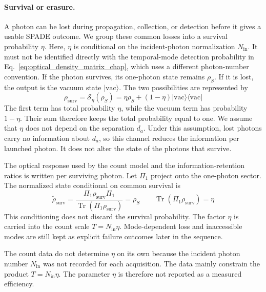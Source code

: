 \paragraph{Survival or erasure.}
A photon can be lost during propagation, collection, or detection before it gives a usable SPADE outcome.  We group these common losses into a survival probability $\eta$. Here, $\eta$ is conditional on the incident-photon normalization $N_{\mathrm{in}}$. It must not be identified directly with the temporal-mode detection probability in Eq.~\eqref{eq:optical_density_matrix_chap}, which uses a different photon-number convention. If the photon survives, its one-photon state remains $\rho_S$.  If it is lost, the output is the vacuum state $|\mathrm{vac}\rangle$.  The two possibilities are represented by
\begin{equation}
    \rho_{\mathrm{surv}}
    =\mathcal{S}_{\eta}(\rho_S)
    =\eta\rho_S+(1-\eta)|\mathrm{vac}\rangle\langle\mathrm{vac}|
    \label{eq:spade_loss_channel}
\end{equation}
The first term has total probability $\eta$, while the vacuum term has probability $1-\eta$.  Their sum therefore keeps the total probability equal to one.  We assume that $\eta$ does not depend on the separation $d_a$.  Under this assumption, lost photons carry no information about $d_a$, so this channel reduces the information per launched photon.  It does not alter the state of the photons that survive.

The optical response used by the count model and the information-retention ratios is written per surviving photon. Let $\Pi_1$ project onto the one-photon sector. The normalized state conditional on common survival is
\begin{equation}
    \widetilde{\rho}_{\mathrm{surv}}
    =
    \frac{\Pi_1\rho_{\mathrm{surv}}\Pi_1}
    {\operatorname{Tr}(\Pi_1\rho_{\mathrm{surv}})}
    =\rho_S
    \qquad
    \operatorname{Tr}(\Pi_1\rho_{\mathrm{surv}})=\eta
    \label{eq:spade_conditional_survival_state}
\end{equation}
This conditioning does not discard the survival probability. The factor $\eta$ is carried into the count scale $T=N_{\mathrm{in}}\eta$. Mode-dependent loss and inaccessible modes are still kept as explicit failure outcomes later in the sequence.

The count data do not determine $\eta$ on its own because the incident photon number $N_{\mathrm{in}}$ was not recorded for each acquisition.  The data mainly constrain the product $T=N_{\mathrm{in}}\eta$.  The parameter $\eta$ is therefore not reported as a measured efficiency.

